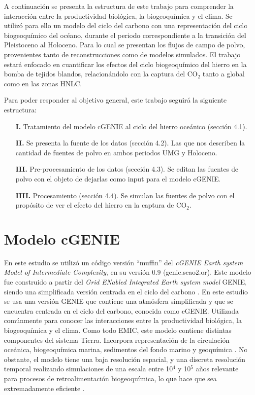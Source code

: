 
 A continuación se presenta la estructura de este trabajo para comprender la interacción entre la productividad biológica, la biogeoquímica y el clima. Se utilizó para ello un modelo del ciclo del carbono con una representación del ciclo biogeoquímico del océano, durante el periodo correspondiente a la transición del Pleistoceno al Holoceno. Para lo cual se presentan los flujos de campo de polvo, provenientes tanto de reconstrucciones como de modelos simulados. El trabajo estará enfocado en cuantificar los efectos del ciclo biogeoquímico del hierro en la bomba de tejidos blandos, relacionándolo con la captura del CO$_2$ tanto a global como en las zonas HNLC. 

 Para poder responder al objetivo general, este trabajo seguirá la siguiente estructura: 

\begin{itemize}
\item[\bf I.] Tratamiento del modelo cGENIE al ciclo del hierro oceánico (sección 4.1).
\item[\bf II.] Se presenta la fuente de los datos (sección 4.2). Las que nos describen la cantidad de fuentes de polvo en ambos periodos UMG y Holoceno.  
\item[\bf III.] Pre-procesamiento de los datos (sección 4.3). Se editan las fuentes de polvo con el objeto de dejarlas como input para el modelo cGENIE. 
\item[\bf IIII.] Procesamiento (sección 4.4). Se simulan las fuentes de polvo con el propósito de ver el efecto del hierro en la captura de CO$_2$. 
\end{itemize} \newpage

 \section{Modelo cGENIE}
En este estudio se utilizó un código versión ``muffin'' del \textit{cGENIE Earth system Model of Intermediate Complexity}, en su versión 0.9 (genie.seao2.or). Este modelo fue construido a partir del \textit{Grid ENabled Integrated Earth system model} GENIE, siendo una simplificada versión centrada en el ciclo del carbono \citep{ridgwell2007marine}. En este estudio se usa una versión GENIE que contiene una atmósfera simplificada y que se encuentra centrada en el ciclo del carbono, conocida como cGENIE. Utilizada comúnmente para conocer las interacciones entre la productividad biológica, la biogeoquímica y el clima. Como todo EMIC, este modelo contiene distintas componentes del sistema Tierra. Incorpora representación de la circulación oceánica, biogeoquímica marina, sedimentos del fondo marino y geoquímica \citep{lenton2007effects}. No obstante, el modelo tiene una baja resolución espacial, y una discreta resolución temporal realizando simulaciones de una escala entre 10$^4$ y 10$^5$ años \citep{meyer2016influence} relevante para procesos de retroalimentación biogeoquímica, lo que hace que sea extremadamente eficiente \citep{edwards2005uncertainties}. 

